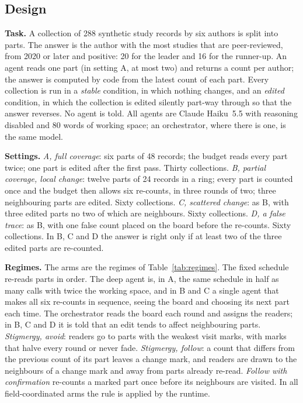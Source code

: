 \documentclass[10pt,twocolumn]{article}
\begin{document}
\subsection{Design}

\textbf{Task.} A collection of 288 synthetic study records by six authors is split into parts. The answer is the author with the most studies that are peer-reviewed, from 2020 or later and positive: 20 for the leader and 16 for the runner-up. An agent reads one part (in setting A, at most two) and returns a count per author; the answer is computed by code from the latest count of each part. Every collection is run in a \emph{stable} condition, in which nothing changes, and an \emph{edited} condition, in which the collection is edited silently part-way through so that the answer reverses. No agent is told. All agents are Claude Haiku~5.5 with reasoning disabled and 80 words of working space; an orchestrator, where there is one, is the same model.

\textbf{Settings.}
\emph{A, full coverage}: six parts of 48 records; the budget reads every part twice; one part is edited after the first pass. Thirty collections.
\emph{B, partial coverage, local change}: twelve parts of 24 records in a ring; every part is counted once and the budget then allows six re-counts, in three rounds of two; three neighbouring parts are edited. Sixty collections.
\emph{C, scattered change}: as B, with three edited parts no two of which are neighbours. Sixty collections.
\emph{D, a false trace}: as B, with one false count placed on the board before the re-counts. Sixty collections.
In B, C and D the answer is right only if at least two of the three edited parts are re-counted.

\textbf{Regimes.} The arms are the regimes of Table~\ref{tab:regimes}. The fixed schedule re-reads parts in order. The deep agent is, in A, the same schedule in half as many calls with twice the working space, and in B and C a single agent that makes all six re-counts in sequence, seeing the board and choosing its next part each time. The orchestrator reads the board each round and assigns the readers; in B, C and D it is told that an edit tends to affect neighbouring parts. \emph{Stigmergy, avoid}: readers go to parts with the weakest visit marks, with marks that halve every round or never fade. \emph{Stigmergy, follow}: a count that differs from the previous count of its part leaves a change mark, and readers are drawn to the neighbours of a change mark and away from parts already re-read. \emph{Follow with confirmation} re-counts a marked part once before its neighbours are visited. In all field-coordinated arms the rule is applied by the runtime.
\end{document}
